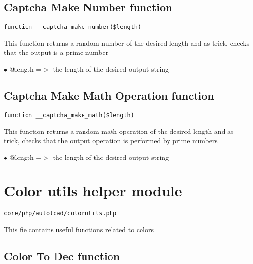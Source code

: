 \documentclass[a4paper]{book}
\begin{document}
\hypertarget{toc43}{}
\subsection{Captcha Make Number function}

\begin{lstlisting}
function __captcha_make_number($length)
\end{lstlisting}

This function returns a random number of the desired length and as trick,
checks that the output is a prime number

\begin{compactitem}
\item[\color{myblue}$\bullet$] @length =$>$ the length of the desired output string
\end{compactitem}

\hypertarget{toc44}{}
\subsection{Captcha Make Math Operation function}

\begin{lstlisting}
function __captcha_make_math($length)
\end{lstlisting}

This function returns a random math operation of the desired length and
as trick, checks that the output operation is performed by prime numbers

\begin{compactitem}
\item[\color{myblue}$\bullet$] @length =$>$ the length of the desired output string
\end{compactitem}

\hypertarget{toc45}{}
\section{Color utils helper module}

\begin{lstlisting}
core/php/autoload/colorutils.php
\end{lstlisting}

This fie contains useful functions related to colors

\hypertarget{toc46}{}
\subsection{Color To Dec function}
\end{document}
